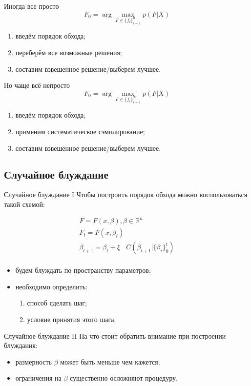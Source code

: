 \documentclass[14pt, fleqn, xcolor={dvipsnames, table}]{beamer}
\begin{document}
\begin{frame}{Иногда все просто}
$$
F_0 = \arg\max_{F \in \{f_i\}_{i=1}^n} p(F|X)
$$
\begin{enumerate}
  \item введём порядок обхода;
  \item переберём все возможные решения;
  \item составим взвешенное решение/выберем лучшее.
\end{enumerate}
\end{frame}

\begin{frame}{Но чаще всё непросто}
$$
F_0 = \arg\max_{F \in \{f_i\}_{i=1}^\infty} p(F|X)
$$
\begin{enumerate}
  \item введём порядок обхода;
  \item применим систематическое сэмплирование;
  \item составим взвешенное решение/выберем лучшее.
\end{enumerate}
\end{frame}

\subsection{Случайное блуждание}
\begin{frame}{Случайное блуждание I}
Чтобы построить порядок обхода можно воспользоваться такой схемой:

$$\begin{array}{l}
F = F(x, \beta), \beta \in \mathbb{R}^n \\
F_t = F(x, \beta_t) \\
\beta_{t+1} = \beta_t + \xi~~~~C(\beta_{t+1} | \{\beta_i\}_0^t) \\
\end{array}$$

\begin{itemize}
  \item будем блуждать по пространству параметров;
  \item необходимо определить:
  \begin{enumerate}
    \item способ сделать шаг;
    \item условие принятия этого шага.
  \end{enumerate}
\end{itemize}
\end{frame}

\begin{frame}{Случайное блуждание II}
На что стоит обратить внимание при построении блуждания:
\begin{itemize}
  \item размерность $\beta$ может быть меньше чем кажется;
  \item ограничения на $\beta$ существенно осложняют процедуру.
\end{itemize}
\end{frame}
\end{document}
